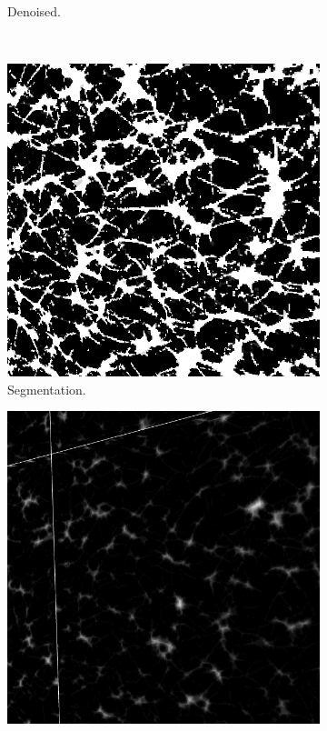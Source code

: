 \begin{figure}[H]
\begin{subfigure}{0.5\textwidth}
    \caption{Denoised.}
    \label{fig:actin_denoised}
  \end{subfigure}\\[1ex]
  \begin{subfigure}{0.5\textwidth}
    \centering
    \includegraphics[width=0.9\linewidth]{Figures/chapter-image/pipeline_screenshots/actin_segmented_sparse.png}
    \caption{Segmentation.}
    \label{fig:actin_segmentation}
  \end{subfigure}%
  \begin{subfigure}{0.5\textwidth}
    \centering
    \includegraphics[width=0.9\linewidth]{Figures/chapter-image/pipeline_screenshots/actin_dmap.png}

\end{subfigure}
\end{figure}
